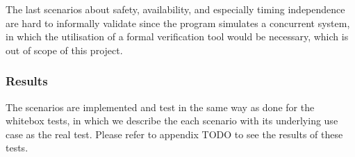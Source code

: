 The last scenarios about safety, availability, and especially timing independence are hard to informally validate since the program simulates a concurrent system, in which the utilisation of a formal verification tool would be necessary, which is out of scope of this project. %

\subsubsection{Results}
The scenarios are implemented and test in the same way as done for the whitebox tests, in which we describe the each scenario with its underlying use case as the real test. Please refer to appendix TODO to see the results of these tests.

    
